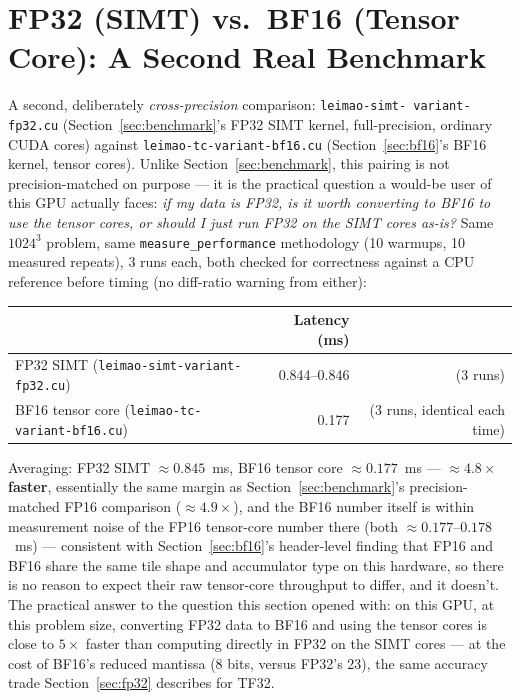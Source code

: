 \documentclass[11pt]{article}
\begin{document}
\section{FP32 (SIMT) vs.\ BF16 (Tensor Core): A Second Real Benchmark}
\label{sec:benchmark-bf16}

A second, deliberately \emph{cross-precision} comparison: \texttt{leimao-simt-\allowbreak
variant-fp32.cu} (Section~\ref{sec:benchmark}'s FP32 SIMT kernel, full-precision, ordinary
CUDA cores) against \texttt{leimao-tc-variant-bf16.cu} (Section~\ref{sec:bf16}'s BF16
kernel, tensor cores). Unlike Section~\ref{sec:benchmark}, this pairing is not
precision-matched on purpose --- it is the practical question a would-be user of this
GPU actually faces: \emph{if my data is FP32, is it worth converting to BF16 to use the
tensor cores, or should I just run FP32 on the SIMT cores as-is?} Same $1024^3$ problem,
same \texttt{measure\_performance} methodology (10 warmups, 10 measured repeats), 3 runs
each, both checked for correctness against a CPU reference before timing (no diff-ratio
warning from either):

\begin{center}
\begin{tabular}{lrr}
\toprule
& Latency (ms) & \\
\midrule
FP32 SIMT (\texttt{leimao-simt-variant-fp32.cu}) & 0.844--0.846 & (3 runs) \\
BF16 tensor core (\texttt{leimao-tc-variant-bf16.cu}) & 0.177 & (3 runs, identical each time) \\
\bottomrule
\end{tabular}
\end{center}

Averaging: FP32 SIMT $\approx 0.845$~ms, BF16 tensor core $\approx 0.177$~ms ---
\textbf{$\approx\!4.8\times$ faster}, essentially the same margin as
Section~\ref{sec:benchmark}'s precision-matched FP16 comparison ($\approx 4.9\times$),
and the BF16 number itself is within measurement noise of the FP16 tensor-core number
there (both $\approx 0.177$--$0.178$~ms) --- consistent with Section~\ref{sec:bf16}'s
header-level finding that FP16 and BF16 share the same tile shape and accumulator type
on this hardware, so there is no reason to expect their raw tensor-core throughput to
differ, and it doesn't. The practical answer to the question this section opened with:
on this GPU, at this problem size, converting FP32 data to BF16 and using the tensor
cores is close to $5\times$ faster than computing directly in FP32 on the SIMT cores ---
at the cost of BF16's reduced mantissa (8 bits, versus FP32's 23), the same accuracy
trade Section~\ref{sec:fp32} describes for TF32.
\end{document}
